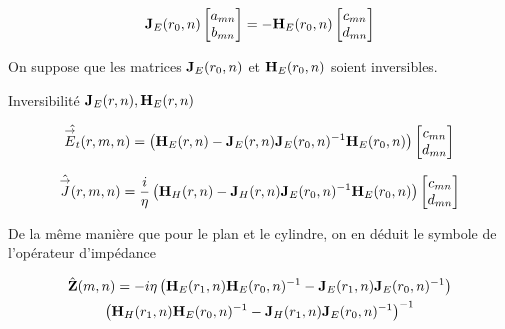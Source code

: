         \begin{equation}
            \mathbf{J}_{E}(r_0,n)
            \begin{bmatrix}
                a_{mn}
                \\
                b_{mn}
            \end{bmatrix}
            = - 
            \mathbf{H}_{E}(r_0,n)
            \begin{bmatrix}
                c_{mn}
                \\
                d_{mn}
            \end{bmatrix}
        \end{equation}

        On suppose que les matrices \(\mathbf{J}_{E}(r_0,n)\) et \(\mathbf{H}_{E}(r_0,n)\) soient inversibles.

        \begin{TODO}
          Inversibilité \(\mathbf{J}_{E}(r,n), \mathbf{H}_{E}(r,n)\)
        \end{TODO}

        \begin{equation}
            \hat{{\overset{\rightarrow}{E}}_t}(r,m,n) = 
            \left(
                \mathbf{H}_{E}(r,n)
                -
                \mathbf{J}_{E}(r,n)
                \mathbf{J}_{E}(r_0,n)^{-1}
                \mathbf{H}_{E}(r_0,n)
            \right)
            \begin{bmatrix}
                c_{mn}
                \\
                d_{mn}
            \end{bmatrix}
        \end{equation}


        \begin{equation}
            \hat{{\overset{\rightarrow}{J}}}(r,m,n) = \dfrac{i}{\eta}
            \left(
                \mathbf{H}_{H}(r,n)
                -
                \mathbf{J}_{H}(r,n)
                \mathbf{J}_{E}(r_0,n)^{-1}
                \mathbf{H}_{E}(r_0,n)
            \right)
            \begin{bmatrix}
                c_{mn}
                \\
                d_{mn}
            \end{bmatrix}
        \end{equation}

        De la même manière que pour le plan et le cylindre, on en déduit le symbole de l'opérateur d'impédance

        \begin{multline}
            \hat{\mathbf{Z}}(m,n) = -i\eta
            \left(
                \mathbf{H}_{E}(r_1,n)
                \mathbf{H}_{E}(r_0,n)^{-1}
                -
                \mathbf{J}_{E}(r_1,n)
                \mathbf{J}_{E}(r_0,n)^{-1}
            \right)
            \\
            \left(
                \mathbf{H}_{H}(r_1,n)
                \mathbf{H}_{E}(r_0,n)^{-1}
                -
                \mathbf{J}_{H}(r_1,n)
                \mathbf{J}_{E}(r_0,n)^{-1}
            \right)^{-1}
        \end{multline}

